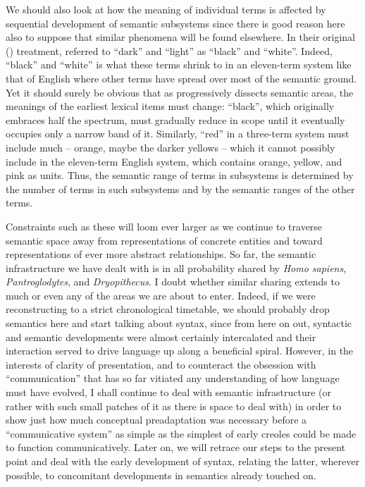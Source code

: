 We should also look at how the meaning of individual terms is affected by sequential development of semantic subsystems since there is good reason here also to suppose that similar phenomena will be found elsewhere. In their original (\citeyear{Berlin1969}) treatment, \citeauthor{Berlin1969} referred to ``dark'' and ``light'' as ``black'' and ``white''. Indeed, ``black'' and ``white'' is what these terms shrink to in an eleven-term system like that of English where other terms have spread over most of the semantic ground. Yet it should surely be obvious that as  progressively dissects semantic areas, the meanings of the earliest lexical items must change: ``black'', which originally embraces half the spectrum, must gradually reduce in scope until it eventually occupies only a narrow band of it. Similarly, ``red'' in a three-term system must include much -- orange, maybe the darker yellows -- which it cannot possibly include in the eleven-term English system, which contains orange, yellow, and pink as units. Thus, the semantic range of terms in subsystems is determined by the number of terms in such subsystems and by the semantic ranges of the other terms.

Constraints such as these will loom ever larger as we continue to traverse semantic space away from representations of concrete entities and toward representations of ever more abstract relationships. So far, the semantic infrastructure we have dealt with is in all probability shared by \textit{Homo sapiens}, \textit{Pantroglodytes}, and \textit{Dryopithecus}. I doubt whether similar sharing extends to much or even any of the areas we are about to enter. Indeed, if we were reconstructing to a strict chrono\-logical timetable, we should probably drop semantics here and start talking about syntax, since from here on out, syntactic and semantic developments were almost certainly intercalated and their interaction served to drive language up along a beneficial spiral. However, in the interests of clarity of presentation, and to counteract the obsession with ``communication'' that has so far vitiated any understanding
of how language must have evolved, I shall continue to deal with semantic infrastructure (or rather with such small patches of it as there is space to deal with) in order to show just how much conceptual preadaptation was necessary before a ``communicative system'' as simple as the simplest of early creoles could be made to function communicatively. Later on, we will retrace our steps to the present point and deal with the early development of syntax, relating the latter, wherever possible, to concomitant developments in semantics already touched on.\\\\

